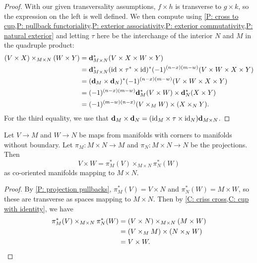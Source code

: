 \begin{proof}
	With our given transversality assumptions, $f \times h$ is transverse to $g \times k$, so the expression on the left is well defined.
	We then compute using \cref{P: cross to cup,P: pullback functoriality,P: exterior associativity,P: exterior commutativity,P: natural exterior} and letting $\tau$ here be the interchange of the interior $N$ and $M$ in the quadruple product:
	\begin{align*}
		(V \times X)\times_{M \times N} (W \times Y)& = \mathbf{d}_{M \times N}^*(V \times X \times W \times Y)\\
		& = \mathbf{d}_{M \times N}^*(\mathrm{id} \times \tau^* \times \mathrm{id})^*(-1)^{(n-x)(m-w)}(V \times W \times X \times Y)\\
		& = (\mathbf{d}_M \times \mathbf{d}_N)^*(-1)^{(n-x)(m-w)}(V \times W \times X \times Y)\\
		& = (-1)^{(n-x)(m-w)}\mathbf{d}_M^*(V \times W) \times \mathbf{d}_N^*( X \times Y)\\
		& = (-1)^{(m-w)(n-x)} (V \times_M W) \times (X \times_N Y).
	\end{align*}
	For the third equality, we use that $\mathbf{d}_M \times \mathbf{d}_N = (\mathrm{id}_M \times \tau \times \mathrm{id}_N)\mathbf{d}_{M \times N}$.
\end{proof}

\begin{corollary}\label{C: cross is cup}
	Let $V \to M$ and $W \to N$ be maps from manifolds with corners to manifolds without boundary.
	Let $\pi_M \colon M \times N \to M$ and $\pi_N \colon M \times N \to N$ be the projections.
	Then $$V \times W = \pi_M^*(V)\times_{M \times N}\pi_N^*(W)$$ as co-oriented manifolds mapping to $M \times N$.
\end{corollary}

\begin{proof}
	By \cref{P: projection pullbacks}, $\pi_M^*(V) = V \times N$ and $\pi_N^*(W) = M \times W$, so these are transverse as spaces mapping to $M \times N$.
	Then by \cref{C: criss cross,C: cup with identity}, we have
	\begin{align*}
		\pi_M^*(V)\times_{M \times N}\pi_N^*(W)& = (V \times N)\times_{M \times N} (M \times W)\\
		& = (V \times_M M) \times (N \times_N W)\\
		& = V \times W.\qedhere
	\end{align*}
\end{proof}

